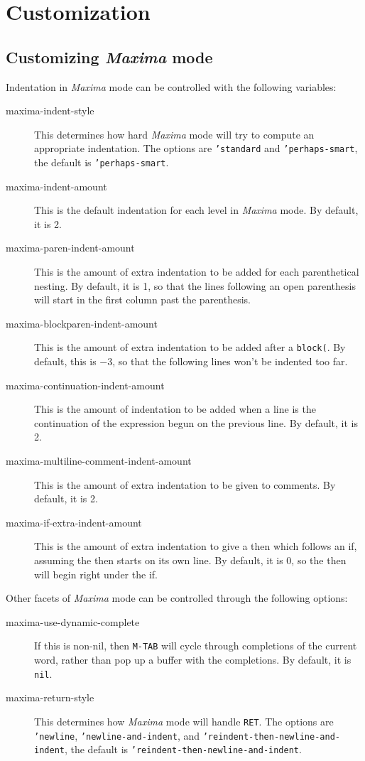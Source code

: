 \documentclass{article}
\newcommand{\mx}{\textsl{\sffamily Maxima}}
\begin{document}
\section{Customization}

\subsection{Customizing \mx{} mode}
\label{app:custmxmode}

Indentation in \mx{} mode can be controlled with the following
variables:
\begin{description}
\item[maxima-indent-style] This determines how hard \mx{} mode will
  try to compute an appropriate indentation.  The options are 
  \texttt{'standard} and \texttt{'perhaps-smart}, the default is
  \texttt{'perhaps-smart}.
\item[maxima-indent-amount] This is the default indentation for each
  level in \mx{} mode.  By default, it is 2.
\item[maxima-paren-indent-amount] This is the amount of extra
  indentation to be added for each parenthetical nesting.  By default,
  it is 1, so that the lines following an open parenthesis will start
  in the first column past the parenthesis.
\item[maxima-blockparen-indent-amount] This is the amount of extra
  indentation to be added after a \texttt{block(}.  By default, this
  is $-3$, so that the following lines won't be indented too far.
\item[maxima-continuation-indent-amount] This is the amount of
  indentation to be added when a line is the continuation of the
  expression begun on the previous line.  By default, it is 2.
\item[maxima-multiline-comment-indent-amount] This is the amount of
  extra indentation to be given to comments.  By default, it is 2.
\item[maxima-if-extra-indent-amount] This is the amount of extra
  indentation to give a then which follows an if, assuming the then
  starts on its own line.  By default, it is 0, so the then will begin
  right under the if.
\end{description}

Other facets of \mx{} mode can be controlled through the following
options: 
\begin{description}
\item[maxima-use-dynamic-complete] If this is non-nil, then
  \texttt{M-TAB} will cycle through completions of the current word,
  rather than pop up a buffer with the completions.  By default, it is
  \texttt{nil}.
\item[maxima-return-style] This determines how \mx{} mode will handle
  \texttt{RET}.  The options are \texttt{'newline},
  \texttt{'newline-and-indent}, and
  \texttt{'reindent-then-newline-and-indent}, the default is
  \texttt{'reindent-then-newline-and-indent}.
\end{description}
\end{document}
